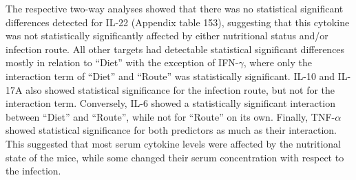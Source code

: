 \documentclass[
  12pt,
  letterpaper,
]{article}
\begin{document}
The respective two-way analyses showed that there was no statistical significant differences detected for IL-22 (Appendix table 153), suggesting that this cytokine was not statistically significantly affected by either nutritional status and/or infection route. All other targets had detectable statistical significant differences mostly in relation to ``Diet'' with the exception of IFN-\(\gamma\), where only the interaction term of ``Diet'' and ``Route'' was statistically significant. IL-10 and IL-17A also showed statistical significance for the infection route, but not for the interaction term. Conversely, IL-6 showed a statistically significant interaction between ``Diet'' and ``Route'', while not for ``Route'' on its own. Finally, TNF-\(\alpha\) showed statistical significance for both predictors as much as their interaction. This suggested that most serum cytokine levels were affected by the nutritional state of the mice, while some changed their serum concentration with respect to the infection.
\end{document}
